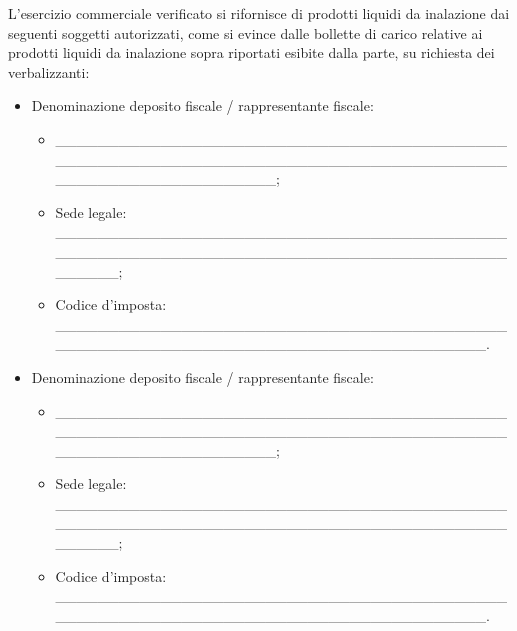 \documentclass[12pt]{article}
\begin{document}
L’esercizio commerciale verificato si rifornisce di prodotti liquidi da inalazione dai seguenti soggetti autorizzati, come si evince dalle bollette di carico relative ai prodotti liquidi da inalazione sopra riportati esibite dalla parte, su richiesta dei verbalizzanti: \\
\begin{itemize}
    \item Denominazione deposito fiscale / rappresentante fiscale:
    \begin{itemize}[label={}]
        \item \_\_\_\_\_\_\_\_\_\_\_\_\_\_\_\_\_\_\_\_\_\_\_\_\_\_\_\_\_\_\_\_\_\_\_\_\_\_\_\_\_\_\_\_\_\_\_\_\_\_\_\_\_\_\_\_\_\_\_\_\_\_\_\_\_\_\_\_\_\_\_\_\_\_\_\_\_\_\_\_\_\_\_\_\_\_\_\_\_\_\_\_\_\_\_\_\_\_\_\_\_\_\_\_\_\_\_;
        \item Sede legale: \_\_\_\_\_\_\_\_\_\_\_\_\_\_\_\_\_\_\_\_\_\_\_\_\_\_\_\_\_\_\_\_\_\_\_\_\_\_\_\_\_\_\_\_\_\_\_\_\_\_\_\_\_\_\_\_\_\_\_\_\_\_\_\_\_\_\_\_\_\_\_\_\_\_\_\_\_\_\_\_\_\_\_\_\_\_\_\_\_\_\_\_;
        \item Codice d'imposta: \_\_\_\_\_\_\_\_\_\_\_\_\_\_\_\_\_\_\_\_\_\_\_\_\_\_\_\_\_\_\_\_\_\_\_\_\_\_\_\_\_\_\_\_\_\_\_\_\_\_\_\_\_\_\_\_\_\_\_\_\_\_\_\_\_\_\_\_\_\_\_\_\_\_\_\_\_\_\_\_\_\_\_\_.
    \end{itemize}
    \item Denominazione deposito fiscale / rappresentante fiscale:
    \begin{itemize}[label={}]
        \item \_\_\_\_\_\_\_\_\_\_\_\_\_\_\_\_\_\_\_\_\_\_\_\_\_\_\_\_\_\_\_\_\_\_\_\_\_\_\_\_\_\_\_\_\_\_\_\_\_\_\_\_\_\_\_\_\_\_\_\_\_\_\_\_\_\_\_\_\_\_\_\_\_\_\_\_\_\_\_\_\_\_\_\_\_\_\_\_\_\_\_\_\_\_\_\_\_\_\_\_\_\_\_\_\_\_\_;
        \item Sede legale: \_\_\_\_\_\_\_\_\_\_\_\_\_\_\_\_\_\_\_\_\_\_\_\_\_\_\_\_\_\_\_\_\_\_\_\_\_\_\_\_\_\_\_\_\_\_\_\_\_\_\_\_\_\_\_\_\_\_\_\_\_\_\_\_\_\_\_\_\_\_\_\_\_\_\_\_\_\_\_\_\_\_\_\_\_\_\_\_\_\_\_\_;
        \item Codice d'imposta: \_\_\_\_\_\_\_\_\_\_\_\_\_\_\_\_\_\_\_\_\_\_\_\_\_\_\_\_\_\_\_\_\_\_\_\_\_\_\_\_\_\_\_\_\_\_\_\_\_\_\_\_\_\_\_\_\_\_\_\_\_\_\_\_\_\_\_\_\_\_\_\_\_\_\_\_\_\_\_\_\_\_\_\_.
    \end{itemize}
\end{itemize}
\end{document}
